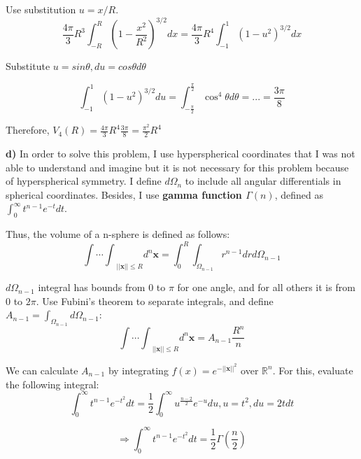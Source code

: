 \documentclass{article}
\begin{document}
Use substitution $u = x/R$.
\begin{equation*}
  \frac{4\pi}{3} R^3 \int_{-R}^{R} (1 - \frac{x^2}{R^2})^{3/2} dx = \frac{4\pi}{3}R^4 \int_{-1}^{1} (1-u^2)^{3/2} dx
\end{equation*}

Substitute $u = sin\theta, du = cos\theta d\theta$

\begin{equation*}
  \int_{-1}^{1} (1-u^2)^{3/2} du = \int_{-\frac{\pi}{2}}^{\frac{\pi}{2}} \cos^4{\theta} d\theta = ... = \frac{3\pi}{8}
\end{equation*}

Therefore, $V_4(R) = \frac{4\pi}{3} R^4 \frac{3\pi}{8} = \frac{\pi^2}{2} R^4 $

\textbf{d)} In order to solve this problem, I use hyperspherical coordinates that I was not able to understand and imagine but it is not necessary for this problem because of hyperspherical symmetry. I define $d\Omega_{n}$ to include all angular differentials in spherical coordinates. Besides, I use \textbf{gamma function $\Gamma(n)$}, defined as $\int_{0}^{\infty} t^{n-1}e^{-t} dt$.

Thus, the volume of a n-sphere is defined as follows:
\begin{equation*}
  {\int \cdots \int}_{||\mathbf{x}|| \le R} d^n\mathbf{x} = \int_{0}^{R} \int_{\Omega_{n-1}} r^{n-1}drd\Omega_{n-1}
\end{equation*}

$d\Omega_{n-1}$ integral has bounds from 0 to $\pi$ for one angle, and for all others it is from 0 to $2\pi$. Use Fubini's theorem to separate integrals, and define $A_{n-1} = \int_{\Omega_{n-1}} d\Omega_{n-1}$:
\begin{equation} \label{eq:hypervolume}
   {\int \cdots \int}_{||\mathbf{x}|| \le R} d^n\mathbf{x}  = A_{n-1}\frac{R^n}{n}
\end{equation}

We can calculate $A_{n-1}$ by integrating $f(x) = e^{-||\mathbf{x}||^2}$ over $\mathbb{R}^n$. For this, evaluate the following integral:
\begin{equation*}
  \int_{0}^{\infty}t^{n-1}e^{-t^2}dt = \frac{1}{2}\int_{0}^{\infty} u^{\frac{n-2}{2}} e^{-u} du, u = t^2, du = 2tdt
\end{equation*}

\begin{equation*}
  \Rightarrow \int_{0}^{\infty}t^{n-1}e^{-t^2}dt = \frac{1}{2} \Gamma(\frac{n}{2})
\end{equation*}
\end{document}
